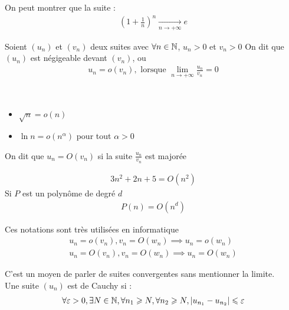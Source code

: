 \begin{exemple}
On peut montrer que la suite :
\begin{align*} 
    \left(1 + \frac{1}{n}\right)^n \xrightarrow[n \to +\infty]{} e
\end{align*}
\end{exemple}

\begin{remarque}
Soient $(u_n)$ et $(v_n)$ deux suites avec $\forall n \in \mathbb{N}$, $u_n > 0$ et $v_n > 0$ On dit que $(u_n)$ est négigeable devant $(v_n)$, ou 
\begin{align*}
    u_n = o(v_n), \text{ lorsque } \lim_{n \to +\infty} \frac{u_n}{v_n} = 0
\end{align*}
\end{remarque}

\begin{exemple}~
    \begin{itemize}
        \item $\sqrt{n} = o(n)$
        \item $\ln n = o(n^{\alpha})$ pour tout $\alpha > 0$
    \end{itemize}
\end{exemple}

\begin{remarque}
On dit que $u_n = O(v_n)$ si la suite $\frac{u_n}{v_n}$ est majorée
\end{remarque}

\begin{exemple}
    \begin{align*}
        3n^2 + 2n + 5 = O(n^2)
    \end{align*}
    Si $P$ est un polynôme de degré $d$
    \begin{align*}
        P(n) = O(n^d)
    \end{align*}
\end{exemple}

\begin{remarque}
Ces notations sont très utilisées en informatique
\begin{align*}
    u_n = o(v_n), v_n = O(w_n) \implies u_n = o(w_n) \\
    u_n = O(v_n), v_n = O(w_n) \implies u_n = O(w_n)
\end{align*}
\end{remarque}

\begin{graybox}
\begin{definition}
C'est un moyen de parler de suites convergentes sans mentionner la limite. \\
Une suite $(u_n)$ est de Cauchy si :
\begin{align*}
    \forall \varepsilon > 0, \exists N \in \mathbb{N}, \forall n_1 \geqslant N, \forall n_2 \geqslant N, |u_{n_1} - u_{n_2}| \leqslant \varepsilon
\end{align*}
\end{definition}
\end{graybox}
